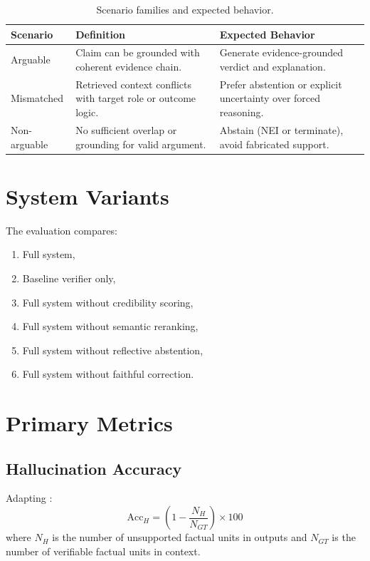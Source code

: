 \documentclass[12pt,a4paper,oneside]{report}
\begin{document}
\begin{table}[htbp]
\centering
\caption{Scenario families and expected behavior.}
\label{tab:scenario}
\begin{tabular}{p{3cm}p{7.2cm}p{4cm}}
\toprule
\textbf{Scenario} & \textbf{Definition} & \textbf{Expected Behavior} \\
\midrule
Arguable & Claim can be grounded with coherent evidence chain. & Generate evidence-grounded verdict and explanation. \\
Mismatched & Retrieved context conflicts with target role or outcome logic. & Prefer abstention or explicit uncertainty over forced reasoning. \\
Non-arguable & No sufficient overlap or grounding for valid argument. & Abstain (NEI or terminate), avoid fabricated support. \\
\bottomrule
\end{tabular}
\end{table}

\section{System Variants}
The evaluation compares:
\begin{enumerate}
  \item Full system,
  \item Baseline verifier only,
  \item Full system without credibility scoring,
  \item Full system without semantic reranking,
  \item Full system without reflective abstention,
  \item Full system without faithful correction.
\end{enumerate}

\section{Primary Metrics}
\subsection{Hallucination Accuracy}
Adapting \citep{zhang2025faithfulness}:
\begin{equation}
\mathrm{Acc}_{H} = \left(1 - \frac{N_H}{N_{GT}}\right)\times 100
\label{eq:acch}
\end{equation}
where $N_H$ is the number of unsupported factual units in outputs and $N_{GT}$ is the number of verifiable factual units in context.
\end{document}
